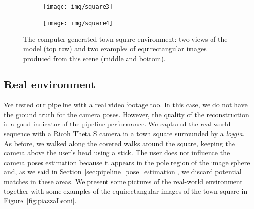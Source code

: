 \begin{figure}
\begin{subfigure}{0.4\textwidth}
	\end{subfigure}
	\begin{subfigure}{0.8\textwidth}
		\centering
		\texttt{[image: img/square3]}
	\end{subfigure}
	\begin{subfigure}{0.8\textwidth}
		\centering
		\texttt{[image: img/square4]}
	\end{subfigure}
	\caption{The computer-generated town square environment: two views of the
	model (top row) and two examples of equirectangular images produced from this
	scene (middle and bottom).}
    \label{fig:test_square}
\end{figure}

\subsection{Real environment}\label{subsec:real_environment}
We tested our pipeline with a real video footage too. In this case, 
we do not have the ground truth
for the camera poses. However, the quality of the
reconstruction is a good indicator of the pipeline performance.
We captured the real-world sequence with a Ricoh Theta S camera in a town square
surrounded by a \emph{loggia}. As before, we walked along the covered
walks around the square, keeping the camera above the user's head using a stick.
The user does not influence the camera poses estimation because it appears in the
pole region of the image sphere and, as we said in
Section~\ref{sec:pipeline_pose_estimation}, we discard potential matches in
these areas.
We present some pictures of the real-world environment together with some examples
of the equirectangular images of the town square in
Figure~\ref{fig:piazzaLeoni}.
%

